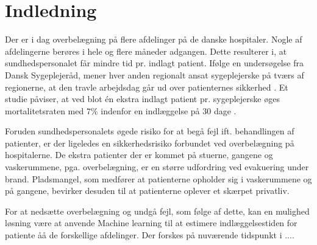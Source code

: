 \chapter{Indledning}
Der er i dag overbelægning på flere afdelinger på de danske hospitaler. Nogle af afdelingerne berøres i hele og flere måneder adgangen. \citep{2015} Dette resulterer i, at sundhedspersonalet får mindre tid pr. indlagt patient. Ifølge en undersøgelse fra Dansk Sygeplejeråd, mener hver anden regionalt ansat sygeplejerske på tværs af regionerne, at den travle arbejdsdag går ud over patienternes sikkerhed \citep{Kjeldsen2015}. Et studie påviser, at ved blot én ekstra indlagt patient pr. sygeplejerske øges mortalitetsraten med $7 \%$ indenfor en indlæggelse på 30 dage  \citep{Aiken2014}. 

Foruden sundhedspersonalets øgede risiko for at begå fejl ift. behandlingen af patienter, er der ligeledes en sikkerhedsrisiko forbundet ved overbelægning på hospitalerne. De ekstra patienter der er kommet på stuerne, gangene og vaskerummene, pga. overbelægning, er en større udfordring ved evakuering under brand. Pladsmangel, som medfører at patienterne opholder sig i vaskerummene og på gangene, bevirker desuden til at patienterne oplever et skærpet privatliv. \citep{Madsen2014}

For at nedsætte overbelægning og undgå fejl, som følge af dette, kan en mulighed løsning være at anvende Machine learning til at estimere indlæggelsestiden for patiente åå de forskellige afdelinger. Der forskes på nuværende tidspunkt i ....